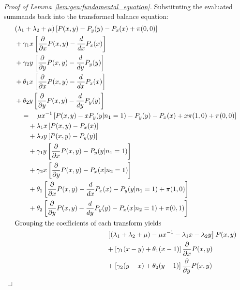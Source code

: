 \begin{proof}[Proof of Lemma~\ref{lem:gen:fundamental_equation}]
    Substituting the evaluated summands back into the transformed balance equation:
    \begin{align}
        \begin{split}
            & (\lambda_1 + \lambda_2 + \mu) \left[
                P(x,y) - P_y(y) - P_x(x) + \pi(0,0)
            \right] \\
            & + \gamma_1 x \left[ \frac{\partial}{\partial x} P(x,y) - \frac{d}{dx} P_x(x) \right] \\
            & + \gamma_2 y \left[ \frac{\partial}{\partial y} P(x,y) - \frac{d}{dy} P_y(y) \right] \\
            & + \theta_1 x \left[ \frac{\partial}{\partial x} P(x,y) - \frac{d}{dx} P_x(x) \right] \\
            & + \theta_2 y \left[ \frac{\partial}{\partial y} P(x,y) - \frac{d}{dy} P_y(y) \right] \\
            & \quad = \quad \mu x^{-1} \left[
                P(x,y) - x P_y(y | n_1=1) - P_y(y) - P_x(x) + x \pi(1,0) + \pi(0,0)
            \right] \\
            & \quad \quad + \lambda_1 x \left[ P(x,y) - P_x(x) \right] \\
            & \quad \quad + \lambda_2 y \left[ P(x,y) - P_y(y) \right] \\
            & \quad \quad + \gamma_1 y \left[ \frac{\partial}{\partial x} P(x,y) - P_y(y | n_1=1) \right] \\
            & \quad \quad + \gamma_2 x \left[ \frac{\partial}{\partial y} P(x,y) - P_x(x | n_2=1) \right] \\
            & \quad \quad + \theta_1 \left[
                \frac{\partial}{\partial x} P(x,y) - \frac{d}{dx} P_x(x) - P_y(y | n_1=1) + \pi(1, 0)
            \right] \\
            & \quad \quad + \theta_2 \left[
                \frac{\partial}{\partial y} P(x,y) - \frac{d}{dy} P_y(y) - P_x(x | n_2=1) + \pi(0, 1)
            \right]
        \end{split} \nonumber \\
        \intertext{Grouping the coefficients of each transform yields}
        \begin{split}
            & \left[ (\lambda_1+\lambda_2+\mu) - \mu x^{-1} - \lambda_1 x - \lambda_2 y \right] P(x,y) \\
            & + \left[ \gamma_1(x-y) + \theta_1(x-1) \right] \frac{\partial}{\partial x} P(x,y) \\
            & + \left[ \gamma_2(y-x) + \theta_2(y-1) \right] \frac{\partial}{\partial y} P(x,y) \\

\end{split}
\end{align}
\end{proof}
